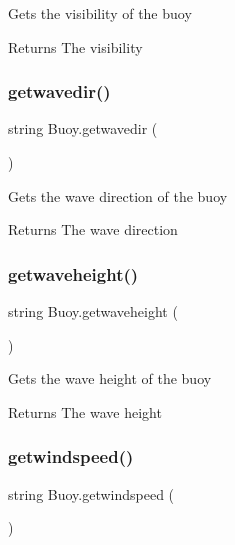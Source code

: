Gets the visibility of the buoy \begin{DoxyReturn}{Returns}
The visibility 
\end{DoxyReturn}
\mbox{\label{class_buoy_a665b522593ab478b242dd8a535c9341e}} 
\subsubsection{\texorpdfstring{getwavedir()}{getwavedir()}}
{\footnotesize\ttfamily string Buoy.\+getwavedir (\begin{DoxyParamCaption}{ }\end{DoxyParamCaption})\hspace{0.3cm}{\ttfamily [inline]}}

Gets the wave direction of the buoy \begin{DoxyReturn}{Returns}
The wave direction 
\end{DoxyReturn}
\mbox{\label{class_buoy_a94314f54fc596eab0a5cceb72b92725a}} 
\subsubsection{\texorpdfstring{getwaveheight()}{getwaveheight()}}
{\footnotesize\ttfamily string Buoy.\+getwaveheight (\begin{DoxyParamCaption}{ }\end{DoxyParamCaption})\hspace{0.3cm}{\ttfamily [inline]}}

Gets the wave height of the buoy \begin{DoxyReturn}{Returns}
The wave height 
\end{DoxyReturn}
\mbox{\label{class_buoy_a03ceca146a3ccd55a0dfeeda8ae64c9d}} 
\subsubsection{\texorpdfstring{getwindspeed()}{getwindspeed()}}
{\footnotesize\ttfamily string Buoy.\+getwindspeed (\begin{DoxyParamCaption}{ }\end{DoxyParamCaption})\hspace{0.3cm}{\ttfamily [inline]}}

